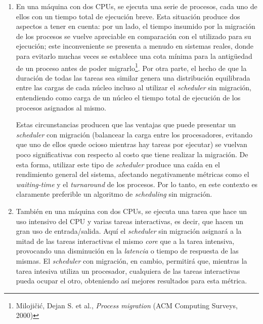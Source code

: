 \begin{enumerate}
    \item En una máquina con dos CPUs, se ejecuta una serie de procesos, cada
    uno de ellos con un tiempo total de ejecución breve. Esta situación
    produce dos aspectos a tener en cuenta: por un lado, el tiempo insumido
    por la migración de los procesos se vuelve apreciable en comparación con
    el utilizado para su ejecución; este inconveniente se presenta a menudo en
    sistemas reales, donde para evitarlo muchas veces se establece una cota
    mínima para la antigüedad de un proceso antes de poder
    migrarlo\footnote{Milojičić, Dejan S. et al., \emph{Process migration}
    (ACM Computing Surveys, 2000)}. Por otra parte, el hecho de que la
    duración de todas las tareas sea similar genera una distribución
    equilibrada entre las cargas de cada núcleo incluso al utilizar el
    \emph{scheduler} sin migración, entendiendo como carga de un núcleo el
    tiempo total de ejecución de los procesos asignados al mismo.

    Estas circunstancias producen que las ventajas que puede presentar un
    \emph{scheduler} con migración (balancear la carga entre los procesadores,
    evitando que uno de ellos quede ocioso mientras hay tareas por ejecutar)
    se vuelvan poco significativas con respecto al costo que tiene realizar la
    migración. De esta forma, utilizar este tipo de \emph{scheduler}
    produce una caída en el rendimiento general del sistema, afectando
    negativamente métricas como el \emph{waiting-time} y el \emph{turnaround}
    de los procesos. Por lo tanto, en este contexto es claramente preferible
    un algoritmo de \emph{scheduling} sin migración.

    \item También en una máquina con dos CPUs, se ejecuta una tarea que hace un
    uso intensivo del CPU y varias tareas interactivas, es
    decir, que hacen un gran uso de entrada/salida. Aquí el \emph{scheduler} sin
    migración asignará a la mitad de las tareas interactivas el mismo
    \emph{core} que a la tarea intensiva, provocando una disminución en la 
    \emph{latencia} o tiempo de respuesta de las mismas. El \emph{scheduler}
    con migración, en cambio, permitirá que, mientras la tarea intesiva
    utiliza un procesador, cualquiera de las tareas interactivas pueda ocupar
    el otro, obteniendo así mejores resultados para esta métrica.


\end{enumerate}
